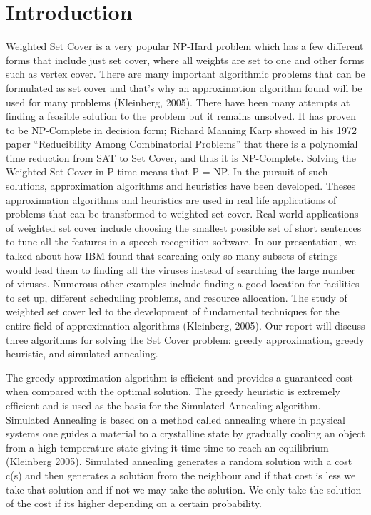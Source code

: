 

% 

\chapter{Introduction}
Weighted Set Cover is a very popular NP-Hard problem which has a few different forms that include just set cover, where all weights are set to one and other forms such as vertex cover. There are many important algorithmic problems that can be formulated as set cover and that’s why an approximation algorithm found will be used for many problems (Kleinberg, 2005). There have been many attempts at finding a feasible solution to the problem but it remains unsolved. It has proven to be NP-Complete in decision form; Richard Manning Karp showed in his 1972 paper “Reducibility Among Combinatorial Problems” that there is a polynomial time reduction from SAT to Set Cover, and thus it is NP-Complete. Solving the Weighted Set Cover in P time means that P = NP. In the pursuit of such solutions, approximation algorithms and heuristics have been developed. Theses approximation algorithms and heuristics are used in real life applications of problems that can be transformed to weighted set cover. Real world applications of weighted set cover include choosing the smallest possible set of short sentences to tune all the features in a speech recognition software. In our presentation, we talked about how IBM found that searching only so many subsets of strings would lead them to finding all the viruses instead of searching the large number of viruses. Numerous other examples include finding a good location for facilities to set up, different scheduling problems, and resource allocation. The study of weighted set cover led to the development of fundamental techniques for the entire field of approximation algorithms (Kleinberg, 2005). Our report will discuss three algorithms for solving the Set Cover problem: greedy approximation, greedy heuristic, and simulated annealing.

The greedy approximation algorithm is efficient and provides a guaranteed cost when compared with the optimal solution. The greedy heuristic is extremely efficient and is used as the basis for the Simulated Annealing algorithm. Simulated Annealing is based on a method called annealing where in physical systems one guides a material to a crystalline state by gradually cooling an object from a high temperature state giving it time time to reach an equilibrium (Kleinberg 2005). Simulated annealing generates a random solution with a cost c(s) and then generates a solution from the neighbour and if that cost is less we take that solution and if not we may take the solution. We only take the solution of the cost if its higher depending on a certain probability.

